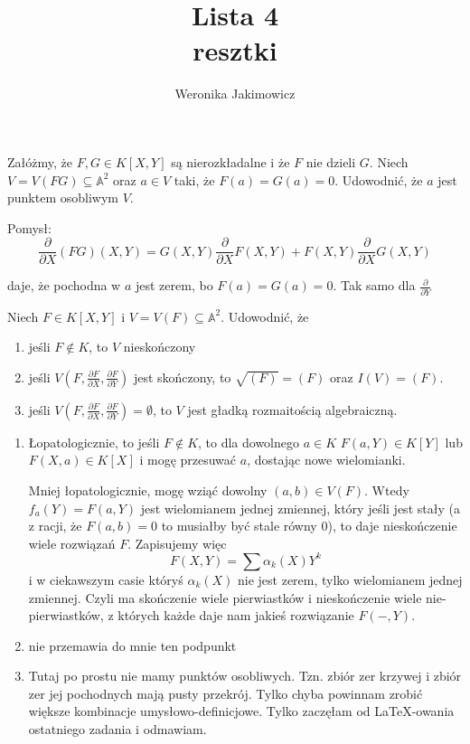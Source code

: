 \documentclass{article}
\title{Lista 4\\{\large resztki}}
\author{Weronika Jakimowicz}
\date{}
\begin{document}
\maketitle

\begin{problem}{8}
  Załóżmy, że $F, G\in K[X, Y]$ są nierozkładalne i że $F$ nie dzieli $G$. Niech $V=V(FG)\subseteq \mathbb{A}^2$ oraz $a\in V$ taki, że $F(a)=G(a)=0$. Udowodnić, że $a$ jest punktem osobliwym $V$.
\end{problem}

Pomysł:
$$\frac{\partial}{\partial X}(FG)(X, Y)=G(X,Y)\frac{\partial}{\partial X}F(X,Y)+F(X,Y)\frac{\partial}{\partial X}G(X,Y)$$

daje, że pochodna w $a$ jest zerem, bo $F(a)=G(a)=0$. Tak samo dla $\frac{\partial}{\partial Y}$

\begin{problem}{9}
  Niech $F\in K[X,Y]$ i $V=V(F)\subseteq\mathbb{A}^2$. Udowodnić, że
  \begin{enumerate}
    \item jeśli $F\notin K$, to $V$ nieskończony
    \item jeśli $V(F, \frac{\partial F}{\partial X}, \frac{\partial F}{\partial Y})$ jest skończony, to $\sqrt{(F)}=(F)$ oraz $I(V)=(F)$.
    \item jeśli $V(F, \frac{\partial F}{\partial X}, \frac{\partial F}{\partial Y})=\emptyset$, to $V$ jest gładką rozmaitością algebraiczną.
  \end{enumerate}
\end{problem}

\begin{enumerate}
  \item Łopatologicznie, to jeśli $F\notin K$, to dla dowolnego $a\in K$ $F(a, Y)\in K[Y]$ lub $F(X, a)\in K[X]$ i mogę przesuwać $a$, dostając nowe wielomianki.

    Mniej łopatologicznie, mogę wziąć dowolny $(a, b)\in V(F)$. Wtedy $f_a(Y)=F(a, Y)$ jest wielomianem jednej zmiennej, który jeśli jest stały (a z racji, że $F(a,b)=0$ to musiałby być stale równy $0$), to daje nieskończenie wiele rozwiązań $F$. Zapisujemy więc
    $$F(X, Y)=\sum \alpha_k(X)Y^k$$
    i w ciekawszym casie któryś $\alpha_k(X)$ nie jest zerem, tylko wielomianem jednej zmiennej. Czyli ma skończenie wiele pierwiastków i nieskończenie wiele nie-pierwiastków, z których każde daje nam jakieś rozwiązanie $F(-, Y)$.
  \item nie przemawia do mnie ten podpunkt
  \item Tutaj po prostu nie mamy punktów osobliwych. Tzn. zbiór zer krzywej i zbiór zer jej pochodnych mają pusty przekrój. Tylko chyba powinnam zrobić większe kombinacje umysłowo-definicjowe. Tylko zaczęłam od \LaTeX-owania ostatniego zadania i odmawiam.

\end{enumerate}
\end{document}
